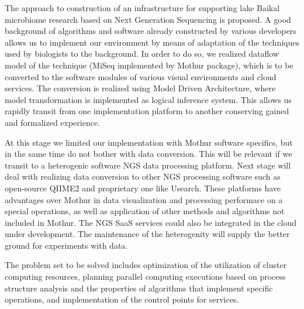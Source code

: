\documentclass[a4paper]{jpconf}
\begin{document}
The approach to construction of an infrastructure for supporting lake Baikal microbiome research based on Next Generation Sequencing is proposed. A good background of algorithms and software already constructed by various developers allows us to implement our environment by means of adaptation of the techniques used by biologists to the background.  In order to do so, we realized dataflow model of the technique (MiSeq implemented by Mothur package), which is to be converted to the software modules of various visual environments and cloud services.  The conversion is realized using Model Driven Architecture, where model transformation is implemented as logical inference system. This allows us rapidly transit from one implementation platform to another conserving gained and formalized experience.


At this stage we limited our implementation with Mothur software specifics, but in the same time do not bother with data conversion.  This will be relevant if we transit to a heterogenic software NGS data processing platform.  Next stage will deal with realizing data conversion to other NGS processing software such as open-source QIIME2 and proprietary one like Usearch.  These platforms have advantages over Mothur in data visualization and processing performace on a special operations, as well as application of other methods and algorithms not included in Mothur. The NGS SaaS services \cite{guo16} could also be integrated in the cloud under development.  The maintenance of the heterogenity will supply the better ground for experiments with data.


The problem set to be solved includes optimization of the utilization of cluster computing resources, planning parallel computing executions based on process structure analysis and the properties of algorithms that implement specific operations, and implementation of the control points for services.
\end{document}
